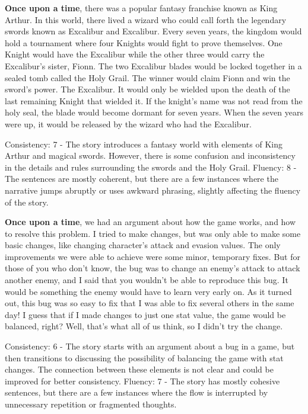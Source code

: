 \documentclass{article}
\begin{document}
\textbf{Once upon a time}, there was a popular fantasy franchise known as King Arthur. In this world, there lived a wizard who could call forth the legendary swords known as Excalibur and Excalibur. Every seven years, the kingdom would hold a tournament where four Knights would fight to prove themselves. One Knight would have the Excalibur while the other three would carry the Excalibur's sister, Fionn. The two Excalibur blades would be locked together in a sealed tomb called the Holy Grail. The winner would claim Fionn and win the sword's power. The Excalibur. It would only be wielded upon the death of the last remaining Knight that wielded it. If the knight's name was not read from the holy seal, the blade would become dormant for seven years. When the seven years were up, it would be released by the wizard who had the Excalibur.

Consistency: 7 - The story introduces a fantasy world with elements of King Arthur and magical swords. However, there is some confusion and inconsistency in the details and rules surrounding the swords and the Holy Grail.
Fluency: 8 - The sentences are mostly coherent, but there are a few instances where the narrative jumps abruptly or uses awkward phrasing, slightly affecting the fluency of the story.

\textbf{Once upon a time}, we had an argument about how the game works, and how to resolve this problem. I tried to make changes, but was only able to make some basic changes, like changing character's attack and evasion values. The only improvements we were able to achieve were some minor, temporary fixes. But for those of you who don't know, the bug was to change an enemy's attack to attack another enemy, and I said that you wouldn't be able to reproduce this bug. It would be something the enemy would have to learn very early on. As it turned out, this bug was so easy to fix that I was able to fix several others in the same day! I guess that if I made changes to just one stat value, the game would be balanced, right? Well, that's what all of us think, so I didn't try the change.

Consistency: 6 - The story starts with an argument about a bug in a game, but then transitions to discussing the possibility of balancing the game with stat changes. The connection between these elements is not clear and could be improved for better consistency.
Fluency: 7 - The story has mostly cohesive sentences, but there are a few instances where the flow is interrupted by unnecessary repetition or fragmented thoughts.
\end{document}
